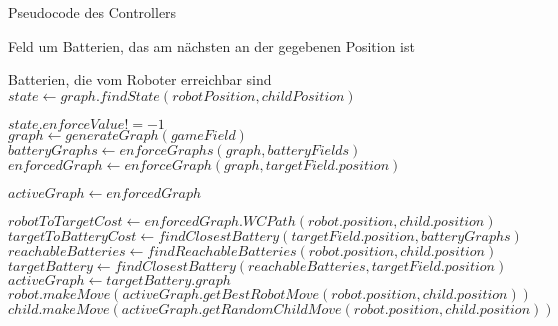 \begin{algorithm}[t]
	\caption{Pseudocode des Controllers}\label{alg:controllerPseudo}
	\begin{algorithmic}[1]
		
		\Return Feld um Batterien, das am nächsten an der gegebenen Position ist
		\EndProcedure
		\\
		
		\Return Batterien, die vom Roboter erreichbar sind
		\EndProcedure
		\\
			\State $state \gets graph.findState(robotPosition, childPosition)$
			
			\Return $state.enforceValue != -1$
		\EndProcedure
		\\
		
			\State $graph \gets generateGraph(gameField)$
			\State $batteryGraphs \gets enforceGraphs(graph, batteryFields)$
			\\
					\State $enforcedGraph \gets enforceGraph(graph, targetField.position)$ 
					
					\State $activeGraph \gets enforcedGraph$
					\\
					
					\State $robotToTargetCost \gets enforcedGraph.WCPath(robot.position, child.position)$
					\State $targetToBatteryCost \gets findClosestBattery(targetField.position, batteryGraphs)$
					\\
						\State $reachableBatteries \gets findReachableBatteries(robot.position, child.position)$
						\State $targetBattery \gets findClosestBattery(reachableBatteries, targetField.position)$
						\State $activeGraph \gets targetBattery.graph$
					\EndIf
					\\
					\State $robot.makeMove(activeGraph.getBestRobotMove(robot.position, child.position))$
					\State $child.makeMove(activeGraph.getRandomChildMove(robot.position, child.position))$
					
					\EndWhile
				\EndFor
			\EndWhile
		\EndProcedure
	\end{algorithmic}
\end{algorithm}


